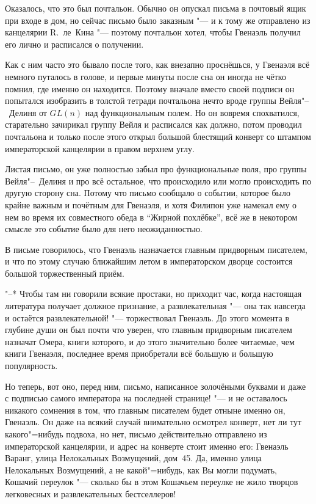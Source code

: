 Оказалось, что это был почтальон.
Обычно он опускал письма в почтовый ящик при входе в дом, но сейчас письмо было
заказным "--- и к тому же отправлено из канцелярии R.~ле~Кина "--- поэтому
почтальон хотел, чтобы Гвенаэль получил его лично и расписался о получении.

Как с ним часто это бывало после того, как внезапно проснёшься, у Гвенаэля всё
немного путалось в голове, и первые минуты после сна он иногда не чётко помнил,
где именно он находится.
Поэтому вначале вместо своей подписи он попытался изобразить в толстой тетради
почтальона нечто вроде группы Вейля"--~Делиня от $GL(n)$ над функциональным
полем.
Но он вовремя спохватился, старательно зачирикал группу Вейля и расписался как
должно, потом проводил почтальона и только после этого открыл большой блестящий
конверт со штампом императорской канцелярии в правом верхнем углу.

Листая письмо, он уже полностью забыл про функциональные поля, про группы
Вейля"--~Делиня и про всё остальное, что происходило или могло происходить по
другую сторону сна.
Потому что письмо сообщало о событии, которое было крайне важным и почётным для
Гвенаэля, и хотя Филипон уже намекал ему о нем во время их совместного обеда в
\enquote{Жирной похлёбке}, всё же в некотором смысле это событие было для него
неожиданностью.

В письме говорилось, что Гвенаэль назначается главным придворным писателем, и
что по этому случаю ближайшим летом в императорском дворце состоится большой
торжественный приём.

"--* Чтобы там ни говорили всякие простаки, но приходит час, когда настоящая
литература получает должное признание, а развлекательная "--- она так навсегда
и остаётся развлекательной! "--- торжествовал Гвенаэль.
До этого момента в глубине души он был почти что уверен, что главным придворным
писателем назначат Омера, книги которого, и до этого значительно более читаемые,
чем книги Гвенаэля, последнее время приобретали всё большую и большую
популярность.

Но теперь, вот оно, перед ним, письмо, написанное золочёными буквами и даже с
подписью самого императора на последней странице! "--- и не оставалось никакого
сомнения в том, что главным писателем будет отныне именно он, Гвенаэль.
Он даже на всякий случай внимательно осмотрел конверт, нет ли тут какого"=нибудь
подвоха, но нет, письмо действительно отправлено из императорской канцелярии, и
адрес на конверте стоит именно его: Гвенаэль Варанг, улица Нелокальных
Возмущений, дом~45.
Да, именно улица Нелокальных Возмущений, а не какой"=нибудь, как Вы могли
подумать, Кошачий переулок "--- сколько бы в этом Кошачьем переулке не жило
творцов легковесных и развлекательных бестселлеров!

